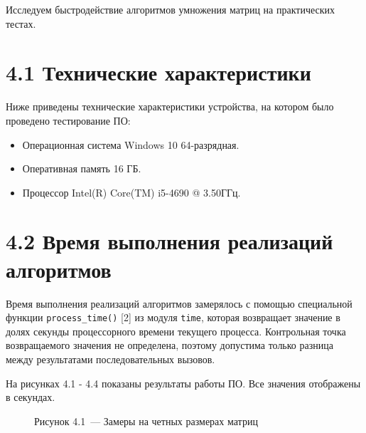 \documentclass[12pt, a4paper]{report}
\begin{document}
Исследуем быстродействие алгоритмов умножения матриц на практических тестах.

\section*{4.1 Технические характеристики}

Ниже приведены технические характеристики устройства, на котором было проведено тестирование ПО:

\begin{itemize}
	\item Операционная система Windows 10 64-разрядная.
	\item Оперативная память 16 ГБ.
	\item Процессор Intel(R) Core(TM) i5-4690 @ 3.50ГГц.
\end{itemize}

\section*{4.2 Время выполнения реализаций алгоритмов}

Время выполнения реализаций алгоритмов замерялось с помощью специальной функции \verb|process_time()| [2] из модуля \verb|time|, которая возвращает значение в долях секунды процессорного времени текущего процесса. Контрольная точка возвращаемого значения не определена, поэтому допустима только разница между результатами последовательных вызовов.

На рисунках 4.1 - 4.4 показаны результаты работы ПО. Все значения отображены в секундах.

\begin{figure}[H]
	\caption*{Рисунок 4.1~--- Замеры на четных размерах матриц}
\end{figure}
\end{document}
